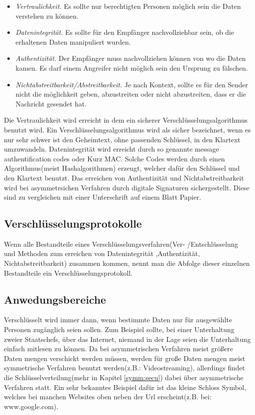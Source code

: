 \documentclass[a4paper,12pt,titlepage]{article}
\begin{document}
\begin{itemize}
\item \textit{Vertraulichkeit.} Es sollte nur berechtigten Personen möglich sein die Daten verstehen zu können.

\item \textit{Datenintegrität.} Es sollte für den Empfänger nachvollziehbar sein, ob die erhaltenen Daten manipuliert wurden.

\item \textit{Authentizität.} Der Empfänger muss nachvollziehen können von wo die Daten kamen. Es darf einem Angreifer nicht möglich sein den Ursprung zu fälschen.

\item \textit{Nichtabstreitbarkeit/Abstreitbarkeit.} Je nach Kontext, sollte es für den Sender nicht die möglichkeit geben, abzustreiten oder nicht abzustreiten, dass er die Nachricht gesendet hat.
\end{itemize} %
Die Vertraulichkeit wird erreicht in dem ein sicherer Verschlüsselungsalgorithmus benutzt wird. Ein Verschlüsselungsalgorithmus wird als sicher bezeichnet, wenn es nur sehr schwer ist den Geheimtext, ohne passenden Schlüssel, in den Klartext umzuwandeln. Datenintegrität wird erreicht durch so genannte message authentification codes oder Kurz MAC. Solche Codes werden durch einen Algorithmus(meist Hashalgorithmen) erzeugt, welcher dafür den Schlüssel und den Klartext benutzt. Das erreichen von Authentizität und Nichtabstreitbarkeit wird bei asymmetrsichen Verfahren durch digitale Signaturen sichergestellt. Diese sind zu vergleichen mit einer Unterschrift auf einem Blatt Papier.%

\subsection{Verschlüsselungsprotokolle}
Wenn alle Bestandteile eines Verschlüsselungsverfahren(Ver- /Entschlüsselung und Methoden zum erreichen von Datenintegrität ,Authentizität, Nichtabstreitbarkeit) zusammen kommen, nennt man die Abfolge dieser einzelnen Bestandteile ein Verschlüsselungsprotokoll.

\subsection{Anwedungsbereiche}
Verschlüsselt wird immer dann, wenn bestimmte Daten nur für ausgewählte Personen zugänglich seien sollen. Zum Beispiel sollte, bei einer Unterhaltung zweier Staatschefs, über das Internet, niemand in der Lage seien die Unterhaltung einfach mitlesen zu können.
Da bei asymmetrischen Verfahren meist größere Daten mengen verschickt werden müssen, werden für große Daten mengen meist symmetrische Verfahren benutzt werden(z.B.: Videostreaming), allerdings findet die Schlüsselverteilung(mehr in Kapitel \ref{symm:secu}) dabei über asymmetrische Verfahren statt. Ein sehr bekanntes Beispiel dafür ist das kleine Schloss Symbol, welches bei manchen Websites oben neben der Url erscheint(z.B. bei: www.google.com).
\end{document}
